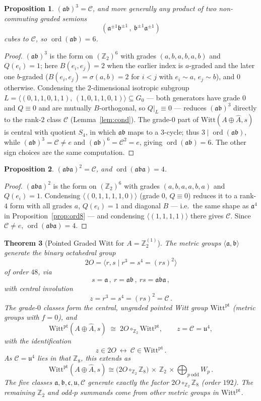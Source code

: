 \documentclass[aps,twocolumn,prx,floatfix,preprintnumbers, nofootinbib,10pt]{revtex4-2}
\numberwithin{equation}{section}
\newtheorem{theorem}{Theorem}[section]
\newtheorem{proposition}[theorem]{Proposition}
\theoremstyle{definition}
\theoremstyle{remark}
\theoremstyle{claim}
\newcommand{\Perm}{S}
\newcommand{\be}{\begin{equation}}
\newcommand{\ee}{\end{equation}}
\newcommand{\ord}{\operatorname{ord}}
\newcommand{\ga}{\mathfrak{a}}
\newcommand{\gb}{\mathfrak{b}}
\newcommand{\gc}{\mathfrak{c}}
\newcommand{\gu}{\mathfrak{u}}
\newcommand{\Z}{{\mathbb Z}}
\newcommand{\cC}{\mathcal{C}}
\newcommand{\Witt}{\text{Witt}}
\newcommand{\pt}{\text{pt}}
\begin{document}
\begin{proposition}\label{prop:ord3}
$(\ga\gb)^3=\cC$, and more generally any product of two non-commuting graded semions
\be 
(\ga^{\pm1}\gb^{\pm1}\,,\ \gb^{\pm1}\ga^{\pm1})
\ee
cubes to $\cC$,  so $\ord(\ga\gb)=6$.
\end{proposition}

\begin{proof}
$(\ga\gb)^3$ is the form on $(\Z_2)^6$ with grades $(a,b,a,b,a,b)$ and $Q(e_i)=1$; here
$B(e_i,e_j)=2$ when the earlier index is $a$-graded and the later one $b$-graded
($B(e_i,e_j)=\sigma(a,b)=2$ for $i<j$ with $e_i\!\sim\!a$, $e_j\!\sim\!b$), and
$0$ otherwise. Condensing the $2$-dimensional isotropic subgroup
$L=\langle(0,1,1,0,1,1),\,(1,0,1,1,0,1)\rangle\subseteq G_0$ --- both generators
have grade $0$ and $Q\equiv0$ and are mutually $B$-orthogonal, so $Q|_L\equiv0$
--- reduces $(\ga\gb)^3$ directly to the rank-$2$ class $\cC$
(Lemma~\ref{lem:cond}).
The grade-$0$ part of $\Witt(A\oplus\widehat A,s)$ is central with quotient $\Perm_4$, in which
$\ga\gb$ maps to a $3$-cycle; thus $3\mid\ord(\ga\gb)$, while $(\ga\gb)^3=\cC\neq e$ and
$(\ga\gb)^6=\cC^2=e$, giving $\ord(\ga\gb)=6$. The other sign choices are the same computation.
\end{proof}

\begin{proposition}\label{prop:transp}
$(\ga\gb\ga)^2=\cC$, and $\ord(\ga\gb\ga)=4$.
\end{proposition}

\begin{proof}
$(\ga\gb\ga)^2$ is the form on $(\Z_2)^6$ with grades $(a,b,a,a,b,a)$ and $Q(e_i)=1$. Condensing
$\langle(0,1,1,1,1,0)\rangle$ (grade $0$, $Q\equiv0$) reduces it to a rank-$4$ form with all grades
$a$, $Q(e_i)=1$ and diagonal $B$ --- i.e.\ the same shape as $\ga^4$ in
Proposition~\ref{prop:ord8} --- and condensing $\langle(1,1,1,1)\rangle$ there gives $\cC$. Since
$\cC\neq e$, $\ord(\ga\gb\ga)=4$.
\end{proof}



\begin{theorem}[Pointed Graded Witt for $A=\Z_2^{(1)}$]\label{thm:2O}
The metric groups $\langle\ga,\gb\rangle$ generate the binary octahedral group 
\be 
2O=\langle r,s\mid r^3=s^4=(rs)^2\rangle
\ee 
of order $48$, via 
\be 
s=\ga\,,\ r=\ga\gb\,,\ 
rs=\ga\gb\ga\,,
\ee
with central involution
\be z=r^3=s^4=(rs)^2=\cC\,.
\ee
The grade-$0$ classes form the central, ungraded pointed Witt group
$\Witt^\pt$ (metric groups with $f=0$), and
\be\label{full}
  \Witt^\pt(A\oplus\widehat A,s)\;\cong\;2O\circ_{\Z_2}\Witt^\pt,\qquad z=\cC=\gu^4,
\ee
with the identification 
\be 
z\in2O \ \longleftrightarrow \ \cC\in\Witt^\pt \,.
\ee
As $\cC=\gu^4$ lies in that $\Z_8$, this extends as
\be\label{fullsplitapp}
\Witt^\pt(A\oplus\widehat A,s) \cong
\big(2O\circ_{\Z_2}\Z_8\big)\,\times\,\Z_2\,\times\!\!\bigoplus_{p\ \mathrm{odd}} W_p\,.
\ee
The five classes $\ga,\gb,\gc,\gu,\cC$ generate exactly the factor $2O\circ_{\Z_2}\Z_8$
(order $192$).  The remaining $\Z_2$ and odd-$p$ summands come from other metric groups in $\Witt^\pt$.
\end{theorem}
\end{document}
